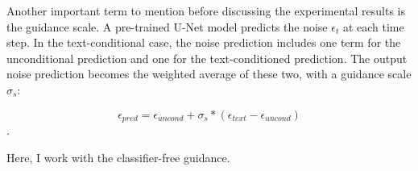Another important term to mention before discussing the experimental results is the guidance scale. A pre-trained U-Net model predicts the noise $\epsilon_t$ at each time step. In the text-conditional case, the noise prediction includes one term for the unconditional prediction and one for the text-conditioned prediction. The output noise prediction becomes the weighted average of these two, with a guidance scale $\sigma_s$:

$$\epsilon_{pred} = \epsilon_{uncond} + \sigma_s * (\epsilon_{text} - \epsilon_{uncond} )$$.

Here, I work with the classifier-free guidance.

